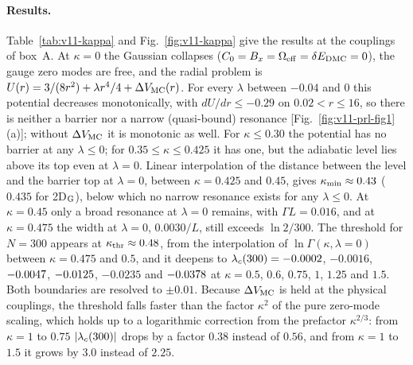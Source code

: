 \paragraph{Results.}
Table~\ref{tab:v11-kappa} and Fig.~\ref{fig:v11-kappa} give the results at the couplings of box~A.
At $\kappa=0$ the Gaussian collapses ($C_0=B_x=\Omega_{\rm eff}=\delta E_{\rm DMC}=0$), the gauge zero modes are free, and the radial problem is $U(r)=3/(8r^2)+\lambda r^4/4+\Delta V_{\rm MC}(r)$.
For every $\lambda$ between $-0.04$ and $0$ this potential decreases monotonically, with $dU/dr\le-0.29$ on $0.02<r\le16$, so there is neither a barrier nor a narrow (quasi-bound) resonance [Fig.~\ref{fig:v11-prl-fig1}(a)]; without $\Delta V_{\rm MC}$ it is monotonic as well. %
For $\kappa\le0.30$ the potential has no barrier at any $\lambda\le0$; for $0.35\le\kappa\le0.425$ it has one, but the adiabatic level lies above its top even at $\lambda=0$.
Linear interpolation of the distance between the level and the barrier top at $\lambda=0$, between $\kappa=0.425$ and $0.45$, gives $\kappa_{\min}\approx0.43$ ($0.435$ for 2D$_{\rm G}$), below which no narrow resonance exists for any $\lambda\le0$. %
At $\kappa=0.45$ only a broad resonance at $\lambda=0$ remains, with $\Gamma L=0.016$, and at $\kappa=0.475$ the width at $\lambda=0$, $0.0030/L$, still exceeds $\ln2/300$. %
The threshold for $N=300$ appears at $\kappa_{\rm thr}\approx0.48$, from the interpolation of $\ln\Gamma(\kappa,\lambda=0)$ between $\kappa=0.475$ and $0.5$, and it deepens to $\lambda_c(300)=-0.0002$, $-0.0016$, $-0.0047$, $-0.0125$, $-0.0235$ and $-0.0378$ at $\kappa=0.5$, $0.6$, $0.75$, $1$, $1.25$ and $1.5$. %
Both boundaries are resolved to $\pm0.01$.
Because $\Delta V_{\rm MC}$ is held at the physical couplings, the threshold falls faster than the factor $\kappa^2$ of the pure zero-mode scaling, which holds up to a logarithmic correction from the prefactor $\kappa^{2/3}$: from $\kappa=1$ to $0.75$ $|\lambda_c(300)|$ drops by a factor $0.38$ instead of $0.56$, and from $\kappa=1$ to $1.5$ it grows by $3.0$ instead of $2.25$. %

